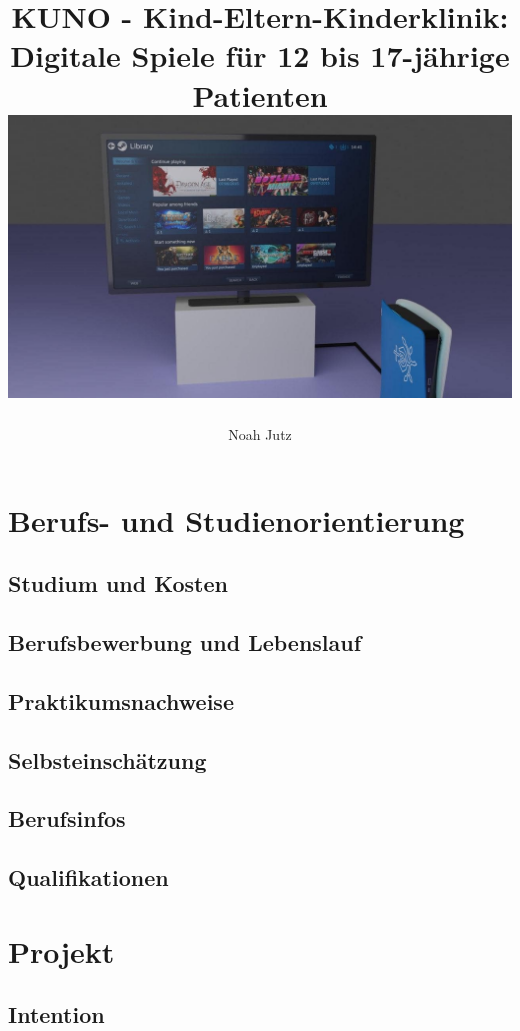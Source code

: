 \documentclass[12pt]{article}
\title{
    KUNO - Kind-Eltern-Kinderklinik: Digitale Spiele für 12 bis 17-jährige Patienten
    \newline\vspace{0.5cm}
    \centering\includegraphics[width=\textwidth]{ps5_steam.jpg}
}
\author{Noah Jutz}
\date{}
\begin{document}
    \maketitle

    \newpage
    \tableofcontents

    \newpage
    \section{Berufs- und Studienorientierung}
    \subsection{Studium und Kosten}
    

    \newpage
    \subsection{Berufsbewerbung und Lebenslauf}
    

    \subsection{Praktikumsnachweise}
    

    \subsection{Selbsteinschätzung}
    

    \newpage
    \subsection{Berufsinfos}
    

    \newpage
    \subsection{Qualifikationen}
    

    \newpage
    \section{Projekt}
    \subsection{Intention}
    
\end{document}
